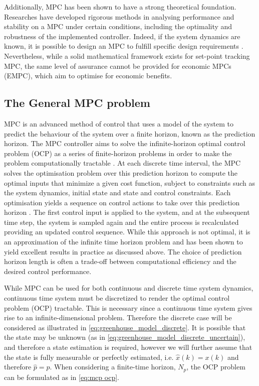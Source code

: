 Additionally, MPC has been shown to have a strong theoretical foundation. Researches have developed rigorous methods in analysing performance and stability on a MPC under certain conditions, including the optimality and robustness of the implemented controller. Indeed, if the system dynamics are known, it is possible to design an MPC to fulfill specific design requirements \cite{rawlingsModelPredictiveControl2017}. Nevertheless, while a solid mathematical framework exists for set-point tracking MPC, the same level of assurance cannot be provided for economic MPCs (EMPC), which aim to optimise for economic benefits.

\subsection {The General MPC problem}\label{ssection:general-mpc}
MPC is an advanced method of control that uses a model of the system to predict the behaviour of the system over a finite horizon, known as the prediction horizon. The MPC controller  aims to solve the infinite-horizon optimal control problem (OCP) as a series of finite-horizon problems in order to make the problem computationally tractable \cite{beckenbachAddressingInfinitehorizonOptimization2018}. At each discrete time interval, the MPC solves the optimisation problem over this prediction horizon to compute the optimal inputs that minimize a given cost function, subject to constraints such as the system dynamics, initial state and state and control constraints. Each optimisation yields a sequence on control actions to take over this prediction horizon . The first control input is applied to the system, and at the subsequent time step, the system is sampled again and the entire process is recalculated providing an updated control sequence. While this approach is not optimal, it is an approximation of the infinite time horizon problem and has been shown to yield excellent results in practice as discussed above. The choice of prediction horizon length is often a trade-off between computational efficiency and the desired control performance. 

While MPC can be used for both continuous and discrete time system dynamics,  continuous time system must be discretized to render the optimal control problem (OCP) tractable. This is necessary since a continuous time system gives rise to an infinite-dimensional problem. Therefore the discrete case will be considered as illustrated in \autoref{eq:greenhouse_model_discrete}.
It is possible that the state may be unknown (as in \autoref{eq:greenhouse_model_discrete_uncertain}), and therefore a state estimation is required, however we will further assume that the state is fully measurable or perfectly estimated, i.e. $\hat x(k) = x(k)$ and therefore $\hat{p} = p$. When considering a finite-time horizon, $N_p$, the OCP problem can be formulated as in \autoref{eq:mcp ocp}.

